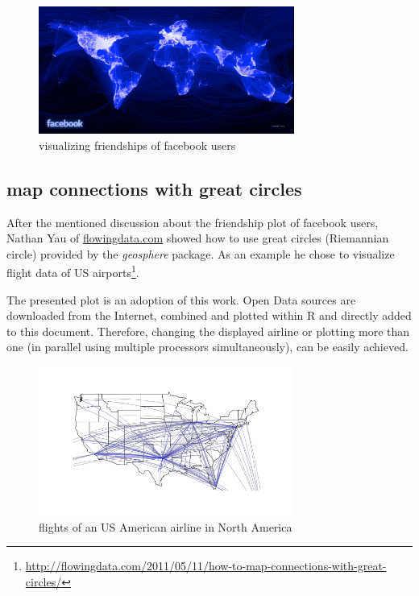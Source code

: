 \documentclass{ifacconf}
\begin{document}
\begin{figure}[h]
\begin{center}
\includegraphics[width=8.4cm]{pics/facebook.png}    %
\caption{visualizing friendships of facebook users} 
\label{fig:facebook}
\end{center}
\end{figure}

\subsection{map connections with great circles}
After the mentioned discussion about the friendship plot of facebook users,
Nathan Yau of \url{flowingdata.com} showed how to use great circles
(Riemannian circle) provided by the \textit{geosphere} package. As an example he chose to
visualize flight data of US 
airports\footnote{\url{http://flowingdata.com/2011/05/11/how-to-map-connections-with-great-circles/}}.

The presented plot is an adoption of this work. Open Data sources are downloaded from
the Internet, combined and plotted within R and directly added to this document.
Therefore, changing the displayed airline or plotting more than one (in parallel using
multiple processors simultaneously), can be easily achieved.


\begin{figure}[h]
\begin{center}
\includegraphics[width=8.4cm]{pics/flights.png}    %
\caption{flights of an US American airline in North America} 
\label{fig:flights}
\end{center}
\end{figure}
\end{document}
